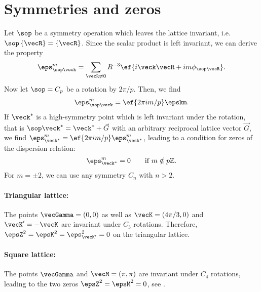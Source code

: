 \section{Symmetries and zeros}
Let $\sop$ be a symmetry operation which leaves the lattice invariant, i.e. $\sop \, \{ \vecR \} = \{ \vecR \}$.
Since the scalar product is left invariant,
we can derive the property
\begin{align}
    \eps_{\sop\veck}^m = \sum_{\vecR\ne 0} R^{-3} \ef{i\veck \vecR + i m \phi_{\sop\vecR}}.
\end{align}
Now let $\sop=C_p$ be a rotation by $2\pi/p$. Then, we find
\begin{align}
    \eps_{\sop \veck}^m = \ef{2\pi i m/p} \epskm.
\end{align}
If $\veck^*$ is a high-symmetry point which is left invariant under the rotation, that is
$\sop\veck^* = \veck^* + \vec{G}$ with an arbitrary reciprocal lattice vector $\vec{G}$, we find $\eps_{\veck^*}^m = \ef{2\pi i m/p} \eps_{\veck^*}^m$, leading to a condition for zeros of the dispersion relation:
\begin{align}
    \eps^m_{\veck^*} = 0\qquad\text{if } m \notin p\mathbb{Z}.
\end{align}
For $m=\pm 2$, we can use any symmetry $C_n$ with $n>2$.


\paragraph{Triangular lattice:} The points $\vecGamma=(0,0)$ as well as
$\vecK=(4\pi/3,0)$ and $\vecK'=- \vecK$ are invariant under $C_3$ rotations. Therefore,
$\epsZ^2=\epsK^2=\eps^2_{\vecK'}=0$ on the triangular lattice.

\paragraph{Square lattice:} The points $\vecGamma$ and $\vecM=(\pi,\pi)$ are
invariant under $C_4$ rotations, leading to the two zeros $\epsZ^2=\epsM^2=0$, see .


